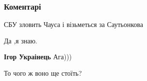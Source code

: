  
 
 
 
 
\subsubsection{Коментарі}

\begin{itemize}
 
СБУ зловить Чауса і візьметься за Саутьонкова

\begin{itemize}
 
Да ,я знаю.

 
\textbf{Ігор Украінець} Ага)))
\end{itemize}

 
То чого ж воно ще стоїть?

\begin{itemize}
 

\end{itemize}
\end{itemize}
